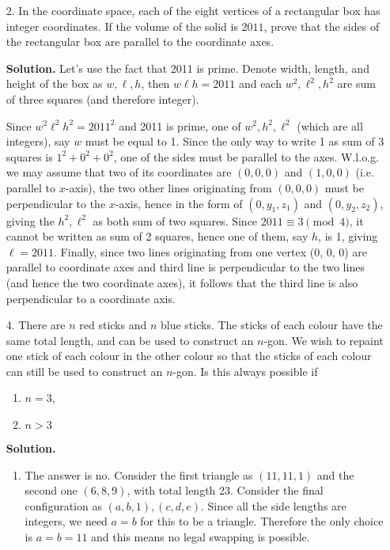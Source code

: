 \documentclass[11pt,a4paper]{article}
\begin{document}
\begin{enumerate}
	\item [2.] In the coordinate space, each of the eight vertices of a rectangular box has integer coordinates. If the volume of the solid is $2011$, prove that the sides of the rectangular box are parallel to the coordinate axes.
	
	\textbf{Solution.} Let's use the fact that 2011 is prime. Denote width, length, and height of the box as $w, \ell, h$, then $w\ell h=2011$ and each $w^2, \ell^2, h^2$ are sum of three squares (and therefore integer). 
	
	Since $w^2\ell^2h^2=2011^2$ and 2011 is prime, one of $w^2, h^2, \ell^2$ (which are all integers), say $w$ must be equal to 1. Since the only way to write 1 as sum of 3 squares is $1^2+0^2+0^2$, one of the sides must be parallel to the axes. W.l.o.g. we may assume that two of its coordinates are $(0, 0, 0)$ and $(1, 0, 0)$ (i.e. parallel to $x$-axis), the two other lines originating from $(0, 0, 0)$ must be perpendicular to the $x$-axis, hence in the form of $(0, y_1, z_1)$ and $(0, y_2, z_2)$, giving the $h^2, \ell^2$ as both sum of two squares. Since $2011\equiv 3\pmod{4}$, it cannot be written as sum of 2 squares, hence one of them, say $h$, is 1, giving $\ell=2011$. Finally, since two lines originating from one vertex (0, 0, 0) are parallel to coordinate axes and third line is perpendicular to the two lines (and hence the two coordinate axes), it follows that the third line is also perpendicular to a coordinate axis. 
	
	\item [4.] There are $n$ red sticks and $n$ blue sticks. The sticks of each colour have the same total length, and can be used to construct an $n$-gon. We wish to repaint one stick of each colour in the other colour so that the sticks of each colour can still be used to construct an $n$-gon. Is this always possible if
	\begin{enumerate}
		\item $n = 3$,
		\item $n > 3$
	\end{enumerate}
	\textbf{Solution.} 
	\begin{enumerate}
		\item The answer is no. Consider the first triangle as $(11, 11, 1)$ and the second one $(6, 8, 9)$, with total length 23. Consider the final configuration as $(a, b, 1), (c, d, e)$. Since all the side lengths are integers, we need $a=b$ for this to be a triangle. Therefore the only choice is $a=b=11$ and this means no legal swapping is possible. 
		

\end{enumerate}
\end{enumerate}
\end{document}
